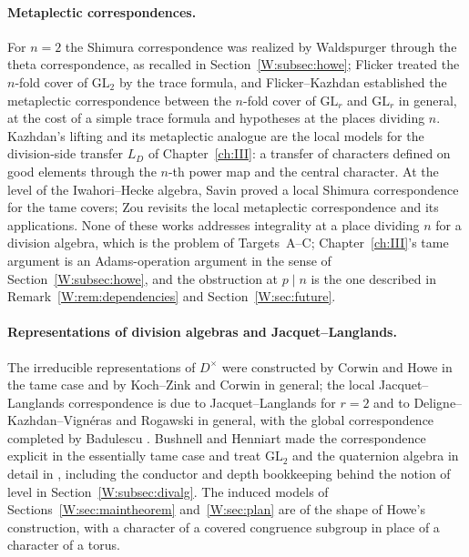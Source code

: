 \paragraph{Metaplectic correspondences.}  For $n=2$ the Shimura
correspondence was realized by Waldspurger \cite{Wal80,Wal91} through the
theta correspondence, as recalled in Section~\ref{W:subsec:howe}; Flicker
\cite{Fli80} treated the $n$-fold cover of $\mathrm{GL}_2$ by the trace
formula, and Flicker--Kazhdan \cite{FK86} established the metaplectic
correspondence between the $n$-fold cover of $\mathrm{GL}_r$ and
$\mathrm{GL}_r$ in general, at the cost of a simple trace formula and
hypotheses at the places dividing $n$.  Kazhdan's lifting \cite{Kaz84} and
its metaplectic analogue \cite{JC26a} are the local models for the division-side
transfer $L_D$ of Chapter~\ref{ch:III}: a transfer of characters defined on good
elements through the $n$-th power map and the central character.  At
the level of the Iwahori--Hecke algebra, Savin \cite{Sav88} proved a local
Shimura correspondence for the tame covers; Zou \cite{Zo23} revisits the
local metaplectic correspondence and its applications.  None of these
works addresses integrality at a place dividing $n$ for a division
algebra, which is the problem of Targets~A--C; Chapter~\ref{ch:III}'s tame argument
is an Adams-operation argument in the sense of Section~\ref{W:subsec:howe},
and the obstruction at $p\mid n$ is the one described in
Remark~\ref{W:rem:dependencies} and Section~\ref{W:sec:future}.

\paragraph{Representations of division algebras and Jacquet--Langlands.}
The irreducible representations of $D^\times$ were constructed by Corwin
\cite{Cor74} and Howe \cite{How77b} in the tame case and by Koch--Zink \cite{KZ80} and
Corwin in general; the local Jacquet--Langlands correspondence is due to
Jacquet--Langlands \cite{JL70} for $r=2$ and to Deligne--Kazhdan--Vign\'eras
\cite{DKV84} and Rogawski \cite{Rog83} in general, with the global correspondence
completed by Badulescu \cite{Bad08}.  Bushnell and Henniart made the
correspondence explicit in the essentially tame case \cite{BH11} and treat
$\mathrm{GL}_2$ and the quaternion algebra in detail in \cite{BH06}, including
the conductor and depth bookkeeping behind the notion of level in
Section~\ref{W:subsec:divalg}.  The induced models of
Sections~\ref{W:sec:maintheorem} and~\ref{W:sec:plan} are of the shape of
Howe's construction, with a character of a covered congruence subgroup
in place of a character of a torus.


